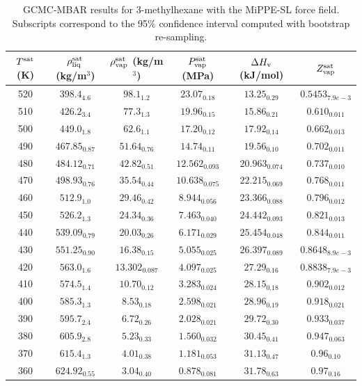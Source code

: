 \documentclass[journal=jctc,manuscript=article]{achemso}
\begin{document}
\begin{table}[htb!]
	\caption{GCMC-MBAR results for 3-methylhexane with the MiPPE-SL force field. Subscripts correspond to the 95\% confidence interval computed with bootstrap re-sampling.}
	\begin{center}
		\begin{tabular}{|c|c|c|c|c|c|}
			\hline
			$T^{\rm sat}$ (K) & $\rho_{\rm liq}^{\rm sat}$ (kg/m$^3$) & $\rho_{\rm vap}^{\rm sat}$ (kg/m$^3$) & $P_{\rm vap}^{\rm sat}$ (MPa) & $\Delta H_{\rm v}$ (kJ/mol) & $Z_{\rm vap}^{\rm sat}$ \\ \hline
			520 & $398.4_{4.6}$ & $98.1_{1.2}$ & $23.07_{0.18}$ & $13.25_{0.29}$ & $0.5453_{7.9e-3}$ \\
			510 & $426.2_{3.4}$ & $77.3_{1.3}$ & $19.96_{0.15}$ & $15.86_{0.21}$ & $0.610_{0.011}$ \\
			500 & $449.0_{1.8}$ & $62.6_{1.1}$ & $17.20_{0.12}$ & $17.92_{0.14}$ & $0.662_{0.013}$ \\
			490 & $467.85_{0.87}$ & $51.64_{0.76}$ & $14.74_{0.11}$ & $19.56_{0.10}$ & $0.702_{0.011}$ \\
			480 & $484.12_{0.71}$ & $42.82_{0.51}$ & $12.562_{0.093}$ & $20.963_{0.074}$ & $0.737_{0.010}$ \\
			470 & $498.93_{0.76}$ & $35.54_{0.44}$ & $10.638_{0.075}$ & $22.215_{0.069}$ & $0.768_{0.011}$ \\
			460 & $512.9_{1.0}$ & $29.46_{0.42}$ & $8.944_{0.056}$ & $23.366_{0.088}$ & $0.796_{0.012}$ \\
			450 & $526.2_{1.3}$ & $24.34_{0.36}$ & $7.463_{0.040}$ & $24.442_{0.093}$ & $0.821_{0.013}$ \\
			440 & $539.09_{0.79}$ & $20.03_{0.26}$ & $6.171_{0.029}$ & $25.454_{0.048}$ & $0.844_{0.011}$ \\
			430 & $551.25_{0.90}$ & $16.38_{0.15}$ & $5.055_{0.025}$ & $26.397_{0.089}$ & $0.8648_{8.9e-3}$ \\
			420 & $563.0_{1.6}$ & $13.302_{0.087}$ & $4.097_{0.025}$ & $27.29_{0.16}$ & $0.8838_{7.9e-3}$ \\
			410 & $574.5_{1.4}$ & $10.70_{0.12}$ & $3.283_{0.024}$ & $28.15_{0.18}$ & $0.902_{0.012}$ \\
			400 & $585.3_{1.3}$ & $8.53_{0.18}$ & $2.598_{0.021}$ & $28.96_{0.19}$ & $0.918_{0.021}$ \\
			390 & $595.7_{2.4}$ & $6.72_{0.26}$ & $2.028_{0.021}$ & $29.72_{0.30}$ & $0.933_{0.037}$ \\
			380 & $605.9_{2.8}$ & $5.23_{0.33}$ & $1.560_{0.032}$ & $30.45_{0.41}$ & $0.947_{0.063}$ \\
			370 & $615.4_{1.3}$ & $4.01_{0.38}$ & $1.181_{0.053}$ & $31.13_{0.47}$ & $0.96_{0.10}$ \\
			360 & $624.92_{0.55}$ & $3.04_{0.40}$ & $0.878_{0.081}$ & $31.78_{0.63}$ & $0.97_{0.16}$ \\
			\hline
		\end{tabular}
	\end{center}
\end{table}
\end{document}
